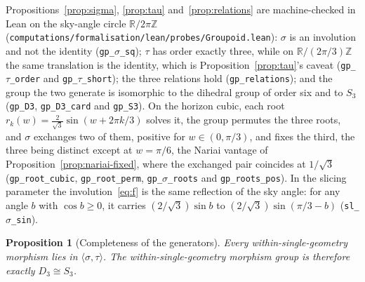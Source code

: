 \documentclass[11pt,a4paper]{article}
\newtheorem{proposition}[theorem]{Proposition}
\theoremstyle{definition}
\begin{document}
Propositions~\ref{prop:sigma}, \ref{prop:tau} and~\ref{prop:relations} are machine-checked in Lean on the sky-angle circle $\mathbb{R}/2\pi\mathbb{Z}$ (\texttt{computations/formalisation/lean/probes/Groupoid.lean}): $\sigma$ is an involution and not the identity (\texttt{gp\_$\sigma$\_sq}); $\tau$ has order exactly three, while on $\mathbb{R}/(2\pi/3)\mathbb{Z}$ the same translation is the identity, which is Proposition~\ref{prop:tau}'s caveat (\texttt{gp\_$\tau$\_order} and \texttt{gp\_$\tau$\_short}); the three relations hold (\texttt{gp\_relations}); and the group the two generate is isomorphic to the dihedral group of order six and to $S_{3}$ (\texttt{gp\_D3}, \texttt{gp\_D3\_card} and \texttt{gp\_S3}). On the horizon cubic, each root $r_{k}(w)=\tfrac{2}{\sqrt3}\sin(w+2\pi k/3)$ solves it, the group permutes the three roots, and $\sigma$ exchanges two of them, positive for $w\in(0,\pi/3)$, and fixes the third, the three being distinct except at $w=\pi/6$, the Nariai vantage of Proposition~\ref{prop:nariai-fixed}, where the exchanged pair coincides at $1/\sqrt3$ (\texttt{gp\_root\_cubic}, \texttt{gp\_root\_perm}, \texttt{gp\_$\sigma$\_roots} and \texttt{gp\_roots\_pos}). In the slicing parameter the involution~\eqref{eq:f} is the same reflection of the sky angle: for any angle $b$ with $\cos b\ge0$, it carries $(2/\sqrt3)\sin b$ to $(2/\sqrt3)\sin(\pi/3-b)$ (\texttt{sl\_$\sigma$\_sin}).

\begin{proposition}[Completeness of the generators]\label{prop:completeness}
Every within-single-geometry morphism lies in $\langle\sigma,\tau\rangle$. The within-single-geometry morphism group is therefore exactly $D_{3}\cong S_{3}$.
\end{proposition}
\end{document}
